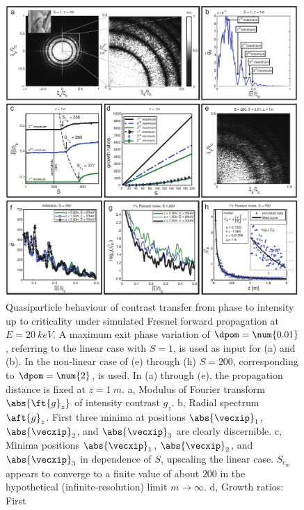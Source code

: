 \documentclass[
twoside,
openright,
titlepage,
numbers=noenddot,
headinclude,
fleqn,
a4paper,
footinclude=true,
cleardoublepage=empty,
abstractoff,
BCOR=5mm,
paper=a4,
fontsize=11pt,
british,ngerman,american,
]{scrreprt}
\begin{document}
\begin{figure}
  \centering
  \includegraphics[width=0.99\textwidth]
  {figures/Quasiparticle/Fig3.pdf}
  \caption[Quasiparticle behaviour of relation between intensity
  contrast and phase up to criticality under simulated Fresnel forward
  propagation.]{Quasiparticle behaviour of contrast transfer from
    phase to intensity up to criticality under simulated Fresnel
    forward propagation at $E = \SI{20}{keV}$.  A maximum exit phase
    variation of $\dpom = \num{0.01}$, referring to the linear case
    with $S = \num{1}$, is used as input for (a) and (b).  In the
    non-linear case of (e) through (h) $S = \num{200}$, corresponding
    to $\dpom = \num{2}$, is used.  In (a) through (e), the
    propagation distance is fixed at $z = \SI{1}{m}$.  a, Modulus of
    Fourier transform $\abs{\ft{g}_z}$ of intensity contrast $g_z$.
    b, Radial spectrum $\aft{g}_z$.  First three minima at positions
    $\abs{\vecxip}_1$, $\abs{\vecxip}_2$, and $\abs{\vecxip}_3$ are
    clearly discernible.  c, Minima positions $\abs{\vecxip}_1$,
    $\abs{\vecxip}_2$, and $\abs{\vecxip}_3$ in dependence of $S$,
    upscaling the linear case.  $S_{c_m}$ appears to converge to a
    finite value of about $\num{200}$ in the hypothetical
    (infinite-resolution) limit $m\to\infty$.  d, Growth ratios: First
}
\end{figure}
\end{document}
